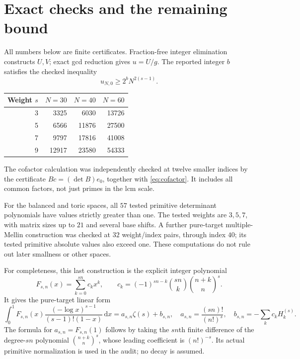 \documentclass[11pt]{article}
\newcommand{\dd}{\,\mathrm{d}}
\newcommand{\HH}[2]{H_{#1}^{(#2)}}
\begin{document}
\section{Exact checks and the remaining bound}
All numbers below are finite certificates. Fraction-free integer
elimination constructs $U,V$; exact gcd reduction gives $u=U/g$.
The reported integer $b$ satisfies the checked inequality
\[
 u_{N,0}\ge 2^b N^{2(s-1)} .
\]
\begin{center}
\begin{tabular}{rrrr}
\toprule
Weight $s$ & $N=30$ & $N=40$ & $N=60$\\
\midrule
3 & 3325 & 6030 & 13726\\
5 & 6566 & 11876 & 27500\\
7 & 9797 & 17816 & 41008\\
9 & 12917 & 23580 & 54333\\
\bottomrule
\end{tabular}
\end{center}
The cofactor calculation was independently checked at twelve smaller
indices by the certificate $Bc=(\det B)e_0$, together with
\eqref{eq:cofactor}. It includes all common factors, not just primes
in the lcm scale.

For the balanced and toric spaces, all $57$ tested primitive determinant
polynomials have values strictly greater than one. The tested weights
are $3,5,7$, with matrix sizes up to $21$ and several base shifts.
A further pure-target multiple-Mellin construction was checked at $32$
weight/index pairs, through index $40$; its tested primitive absolute
values also exceed one. These computations do not rule out later
smallness or other spaces.

For completeness, this last construction is the explicit integer polynomial
\[
 F_{s,n}(x)=\sum_{k=0}^{sn}c_kx^k,\qquad
 c_k=(-1)^{sn-k}\binom{sn}{k}\binom{n+k}{n}^{s}.
\]
It gives the pure-target linear form
\[
 \int_0^1 F_{s,n}(x)\frac{(-\log x)^{s-1}}{(s-1)!(1-x)}\dd x
 =a_{s,n}\zeta(s)+b_{s,n},\quad
 a_{s,n}=\frac{(sn)!}{(n!)^s},\quad
 b_{s,n}=-\sum_kc_k\HH{k}{s}.
\]
The formula for $a_{s,n}=F_{s,n}(1)$ follows by taking the $sn$th
finite difference of the degree-$sn$ polynomial $\binom{n+k}{n}^{s}$,
whose leading coefficient is $(n!)^{-s}$. Its actual primitive
normalization is used in the audit; no decay is assumed.
\end{document}
